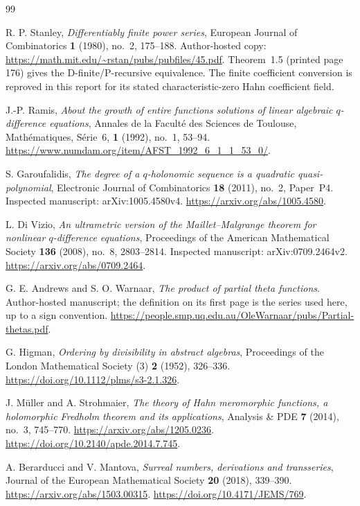 \documentclass[11pt]{article}
\numberwithin{equation}{section}
\theoremstyle{definition}
\theoremstyle{remark}
\begin{document}
\clearpage
\begin{thebibliography}{99}
\raggedright

R. P. Stanley,
\emph{Differentiably finite power series},
European Journal of Combinatorics \textbf{1} (1980), no.~2, 175--188.
Author-hosted copy:
\url{https://math.mit.edu/~rstan/pubs/pubfiles/45.pdf}.
Theorem~1.5 (printed page 176) gives the D-finite/P-recursive equivalence.
The finite coefficient conversion is reproved in this report for its stated
characteristic-zero Hahn coefficient field.

J.-P. Ramis,
\emph{About the growth of entire functions solutions of linear algebraic
$q$-difference equations},
Annales de la Facult\'e des Sciences de Toulouse, Math\'ematiques,
S\'erie~6, \textbf{1} (1992), no.~1, 53--94.
\url{https://www.numdam.org/item/AFST_1992_6_1_1_53_0/}.

S. Garoufalidis,
\emph{The degree of a $q$-holonomic sequence is a quadratic quasi-polynomial},
Electronic Journal of Combinatorics \textbf{18} (2011), no.~2, Paper~P4.
Inspected manuscript: arXiv:1005.4580v4.
\url{https://arxiv.org/abs/1005.4580}.

L. Di Vizio,
\emph{An ultrametric version of the Maillet--Malgrange theorem for nonlinear
$q$-difference equations},
Proceedings of the American Mathematical Society \textbf{136} (2008), no.~8,
2803--2814. Inspected manuscript: arXiv:0709.2464v2.
\url{https://arxiv.org/abs/0709.2464}.

G. E. Andrews and S. O. Warnaar,
\emph{The product of partial theta functions}.
Author-hosted manuscript; the definition on its first page is the series used
here, up to a sign convention.
\url{https://people.smp.uq.edu.au/OleWarnaar/pubs/Partial-thetas.pdf}.

G. Higman,
\emph{Ordering by divisibility in abstract algebras},
Proceedings of the London Mathematical Society (3) \textbf{2} (1952),
326--336.
\url{https://doi.org/10.1112/plms/s3-2.1.326}.

J. M\"uller and A. Strohmaier,
\emph{The theory of Hahn meromorphic functions, a holomorphic Fredholm theorem
and its applications},
Analysis \& PDE \textbf{7} (2014), no.~3, 745--770.
\url{https://arxiv.org/abs/1205.0236}.
\url{https://doi.org/10.2140/apde.2014.7.745}.

A. Berarducci and V. Mantova,
\emph{Surreal numbers, derivations and transseries},
Journal of the European Mathematical Society \textbf{20} (2018), 339--390.
\url{https://arxiv.org/abs/1503.00315}.
\url{https://doi.org/10.4171/JEMS/769}.


\end{thebibliography}
\end{document}

